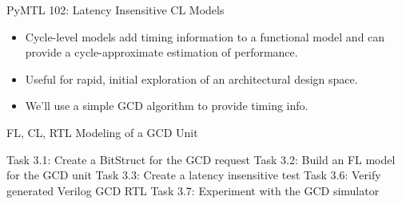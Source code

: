 \begin{frame}{PyMTL 102: Latency Insensitive CL Models}

\begin{itemize}
  \item Cycle-level models add timing information to a functional model
        and can provide a cycle-approximate estimation of performance.
  \smallskip
  \item Useful for rapid, initial exploration of an
        architectural design space.
  \smallskip
  \item We'll use a simple GCD algorithm to provide timing info.
\end{itemize}

\end{frame}


\begin{frame}{ FL, CL, RTL Modeling of a GCD Unit}
\begin{cbxlist}
  \1 Task 3.1: Create a BitStruct for the GCD request
  \1 Task 3.2: Build an FL model for the GCD unit
  \1 Task 3.3: Create a latency insensitive test
  \1 
  \1 
  \1 Task 3.6: Verify generated Verilog GCD RTL
  \1 Task 3.7: Experiment with the GCD simulator
\end{cbxlist}
\end{frame}

